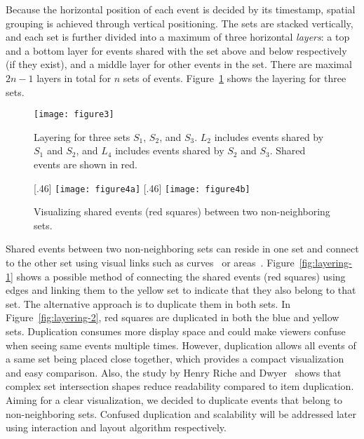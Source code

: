 Because the horizontal position of each event is decided by its timestamp, spatial grouping is achieved through vertical positioning. The sets are stacked vertically, and each set is further divided into a maximum of three horizontal \emph{layers}: a top and a bottom layer for events shared with the set above and below respectively (if they exist), and a middle layer for other events in the set. There are maximal $2n-1$ layers in total for $n$ sets of events. Figure~\ref{fig:layering} shows the layering for three sets. 

\begin{figure}[ht]
\centering
\texttt{[image: figure3]}
\caption{Layering for three sets $S_1$, $S_2$, and $S_3$. $L_2$ includes events shared by $S_1$ and $S_2$, and $L_4$ includes events shared by $S_2$ and $S_3$. Shared events are shown in red.}
\label{fig:layering}
\end{figure}

\begin{figure}[ht]
	\centering
	[.46\columnwidth]
		{\texttt{[image: figure4a]}}\label{fig:layering-1}
	\hfill	
	[.46\columnwidth]
		{\texttt{[image: figure4b]}}\label{fig:layering-2}
	\caption{Visualizing shared events (red squares) between two non-neighboring sets.}
	\label{fig:layering-compare}
\end{figure}

Shared events between two non-neighboring sets can reside in one set and connect to the other set using visual links such as curves~\cite{Alper2011} or areas~\cite{Meulemans2013}. Figure~\ref{fig:layering-1} shows a possible method of connecting the shared events (red squares) using edges and linking them to the yellow set to indicate that they also belong to that set. The alternative approach is to duplicate them in both sets. In Figure~\ref{fig:layering-2}, red squares are duplicated in both the blue and yellow sets. Duplication consumes more display space and could make viewers confuse when seeing same events multiple times. However, duplication allows all events of a same set being placed close together, which provides a compact visualization and easy comparison. Also, the study by Henry Riche and Dwyer~\cite{Riche2010} shows that complex set intersection shapes reduce readability compared to item duplication. Aiming for a clear visualization, we decided to duplicate events that belong to non-neighboring sets. Confused duplication and scalability will be addressed later using interaction and layout algorithm respectively.

